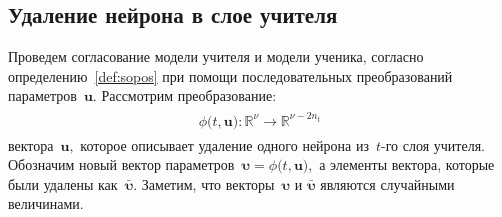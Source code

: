 \documentclass[12pt]{a&t}
\begin{document}
\subsection{Удаление нейрона в слое учителя}
Проведем согласование модели учителя и модели ученика, согласно определению~\ref{def:sopos} при помощи последовательных преобразований параметров~$\mathbf{u}$. Рассмотрим преобразование:
\begin{gather}
\label{eq:ap:2}
\begin{aligned}
\phi\bigr(t, \mathbf{u}\bigr) : \mathbb{R}^{\nu} \to \mathbb{R}^{\nu-2n_t}
\end{aligned}
\end{gather}
вектора~$\mathbf{u},$ которое описывает удаление одного нейрона из~$t$-го слоя учителя.
Обозначим новый вектор параметров~$\bm{\upsilon} =  \phi\bigr(t, \mathbf{u}\bigr),$ а элементы вектора, которые были удалены как~$\bar{\bm{\upsilon}}.$ Заметим, что векторы~$\bm{\upsilon}$ и $\bar{\bm{\upsilon}}$ являются случайными величинами. 
\end{document}
